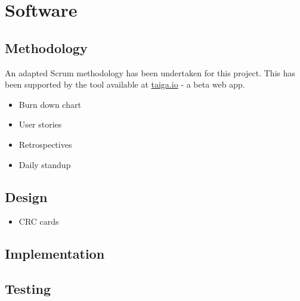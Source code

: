 \section{Software}

\subsection{Methodology}

An adapted Scrum methodology has been undertaken for this project. This has been supported by the tool available at \url{taiga.io} - a beta web app.

\begin{itemize}
  \item Burn down chart
  \item User stories
  \item Retrospectives
  \item Daily standup
\end{itemize}

\subsection{Design}

\begin{itemize}
\item CRC cards
\end{itemize}

\subsection{Implementation}

\subsection{Testing}
